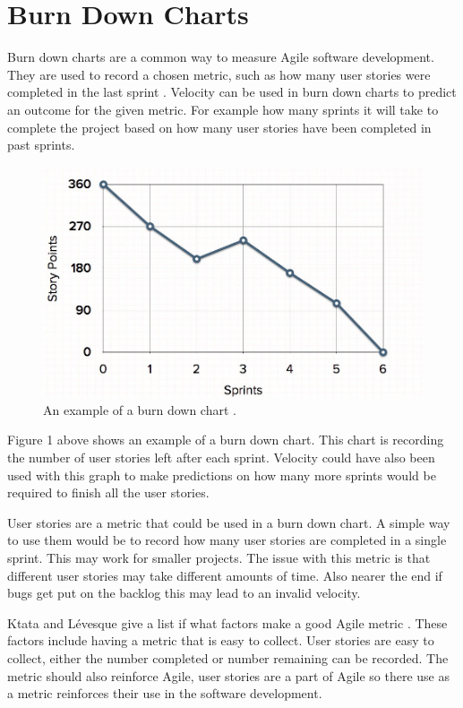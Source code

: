 \documentclass{scrartcl}
\begin{document}
\section{Burn Down Charts}
Burn down charts are a common way to measure Agile software development. They are used to record a chosen metric, such as how many user stories were completed in the last sprint \cite{AgileWithScrum}. Velocity can be used in burn down charts to predict an outcome for the given metric. For example how many sprints it will take to complete the project based on how many user stories have been completed in past sprints.

\begin{figure}[h]
	\includegraphics[width=1.0\linewidth]{BDChart.jpg}
	\caption{ An example of a burn down chart \cite{MGS}.}
\end{figure}

Figure 1 above shows an example of a burn down chart. This chart is recording the number of user stories left after each sprint. Velocity could have also been used with this graph to make predictions on how many more sprints would be required to finish all the user stories.

User stories are a metric that could be used in a burn down chart. A simple way to use them would be to record how many user stories are completed in a single sprint. This may work for smaller projects. The issue with this metric is that different user stories may take different amounts of time. Also nearer the end if bugs get put on the backlog this may lead to an invalid velocity.

Ktata and L\'evesque give a list if what factors make a good Agile metric \cite{Ktata}. These factors include having a metric that is easy to collect. User stories are easy to collect, either the number completed or number remaining can be recorded. The metric should also reinforce Agile, user stories are a part of Agile so there use as a metric reinforces their use in the software development.
\end{document}
